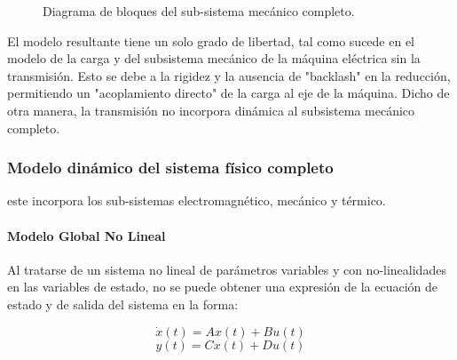 \documentclass[a4paper, 10pt, onecolumn,journal]{ieeeconf}
\begin{document}
\begin{figure}[thpb]
    \centering
    \begin{adjustbox}{max width=\columnwidth}
    \end{adjustbox}
    \caption{Diagrama de bloques del sub-sistema mecánico completo.}
    \label{diagrama de bloques sub-sistema mecanico completo}
\end{figure}

El modelo resultante tiene un solo grado de libertad, tal como sucede en el modelo de la carga y del subsistema mecánico de la máquina eléctrica sin la transmisión. Esto se debe a la rigidez y la ausencia de "backlash" en la reducción, permitiendo un "acoplamiento directo" de la carga al eje de la máquina. Dicho de otra manera, la transmisión no incorpora dinámica al subsistema mecánico completo.

\vspace*{0.2cm}
\subsubsection{\textbf{Modelo dinámico del sistema físico completo}} este incorpora los sub-sistemas electromagnético, mecánico y térmico.
\vspace*{0.1cm}
\paragraph{\textbf{Modelo Global No Lineal}}

Al tratarse de un sistema no lineal de parámetros variables y con no-linealidades en las variables de estado, no se puede obtener una expresión
de la ecuación de estado y de salida del sistema en la forma:

\begin{equation*}
    \dot{x}(t) = A x(t) + B u(t)
\end{equation*}    
\begin{equation*}
    y(t) = C x(t) + D u(t)
\end{equation*}
\end{document}
